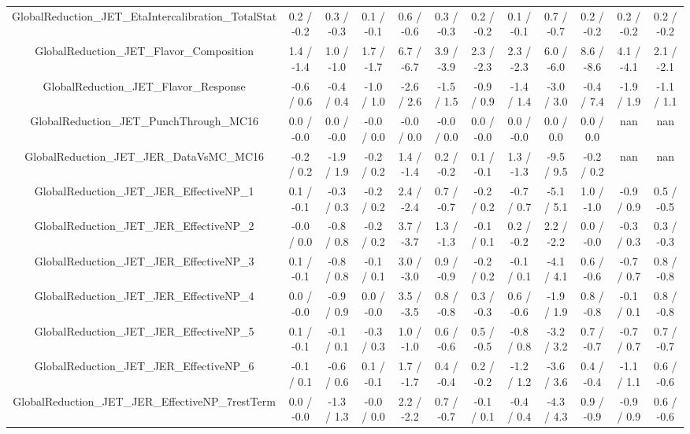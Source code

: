 \begin{table}[htbp]
\begin{center}
\begin{tabular}{|c|c|c|c|c|c|c|c|c|c|c|c|}
  GlobalReduction_JET_EtaIntercalibration_TotalStat & 0.2 / -0.2 & 0.3 / -0.3 & 0.1 / -0.1 & 0.6 / -0.6 & 0.3 / -0.3 & 0.2 / -0.2 & 0.1 / -0.1 & 0.7 / -0.7 & 0.2 / -0.2 & 0.2 / -0.2 & 0.2 / -0.2 \\ 
  GlobalReduction_JET_Flavor_Composition & 1.4 / -1.4 & 1.0 / -1.0 & 1.7 / -1.7 & 6.7 / -6.7 & 3.9 / -3.9 & 2.3 / -2.3 & 2.3 / -2.3 & 6.0 / -6.0 & 8.6 / -8.6 & 4.1 / -4.1 & 2.1 / -2.1 \\ 
  GlobalReduction_JET_Flavor_Response & -0.6 / 0.6 & -0.4 / 0.4 & -1.0 / 1.0 & -2.6 / 2.6 & -1.5 / 1.5 & -0.9 / 0.9 & -1.4 / 1.4 & -3.0 / 3.0 & -0.4 / 7.4 & -1.9 / 1.9 & -1.1 / 1.1 \\ 
  GlobalReduction_JET_PunchThrough_MC16 & 0.0 / -0.0 & 0.0 / -0.0 & -0.0 / 0.0 & -0.0 / 0.0 & -0.0 / 0.0 & 0.0 / -0.0 & 0.0 / -0.0 & 0.0 / 0.0 & 0.0 / 0.0 &    nan    &    nan    \\ 
  GlobalReduction_JET_JER_DataVsMC_MC16 & -0.2 / 0.2 & -1.9 / 1.9 & -0.2 / 0.2 & 1.4 / -1.4 & 0.2 / -0.2 & 0.1 / -0.1 & 1.3 / -1.3 & -9.5 / 9.5 & -0.2 / 0.2 &    nan    &    nan    \\ 
  GlobalReduction_JET_JER_EffectiveNP_1 & 0.1 / -0.1 & -0.3 / 0.3 & -0.2 / 0.2 & 2.4 / -2.4 & 0.7 / -0.7 & -0.2 / 0.2 & -0.7 / 0.7 & -5.1 / 5.1 & 1.0 / -1.0 & -0.9 / 0.9 & 0.5 / -0.5 \\ 
  GlobalReduction_JET_JER_EffectiveNP_2 & -0.0 / 0.0 & -0.8 / 0.8 & -0.2 / 0.2 & 3.7 / -3.7 & 1.3 / -1.3 & -0.1 / 0.1 & 0.2 / -0.2 & 2.2 / -2.2 & 0.0 / -0.0 & -0.3 / 0.3 & 0.3 / -0.3 \\ 
  GlobalReduction_JET_JER_EffectiveNP_3 & 0.1 / -0.1 & -0.8 / 0.8 & -0.1 / 0.1 & 3.0 / -3.0 & 0.9 / -0.9 & -0.2 / 0.2 & -0.1 / 0.1 & -4.1 / 4.1 & 0.6 / -0.6 & -0.7 / 0.7 & 0.8 / -0.8 \\ 
  GlobalReduction_JET_JER_EffectiveNP_4 & 0.0 / -0.0 & -0.9 / 0.9 & 0.0 / -0.0 & 3.5 / -3.5 & 0.8 / -0.8 & 0.3 / -0.3 & 0.6 / -0.6 & -1.9 / 1.9 & 0.8 / -0.8 & -0.1 / 0.1 & 0.8 / -0.8 \\ 
  GlobalReduction_JET_JER_EffectiveNP_5 & 0.1 / -0.1 & -0.1 / 0.1 & -0.3 / 0.3 & 1.0 / -1.0 & 0.6 / -0.6 & 0.5 / -0.5 & -0.8 / 0.8 & -3.2 / 3.2 & 0.7 / -0.7 & -0.7 / 0.7 & 0.7 / -0.7 \\ 
  GlobalReduction_JET_JER_EffectiveNP_6 & -0.1 / 0.1 & -0.6 / 0.6 & 0.1 / -0.1 & 1.7 / -1.7 & 0.4 / -0.4 & 0.2 / -0.2 & -1.2 / 1.2 & -3.6 / 3.6 & 0.4 / -0.4 & -1.1 / 1.1 & 0.6 / -0.6 \\ 
  GlobalReduction_JET_JER_EffectiveNP_7restTerm & 0.0 / -0.0 & -1.3 / 1.3 & -0.0 / 0.0 & 2.2 / -2.2 & 0.7 / -0.7 & -0.1 / 0.1 & -0.4 / 0.4 & -4.3 / 4.3 & 0.9 / -0.9 & -0.9 / 0.9 & 0.6 / -0.6 \\ 

\end{tabular}
\end{center}
\end{table}
